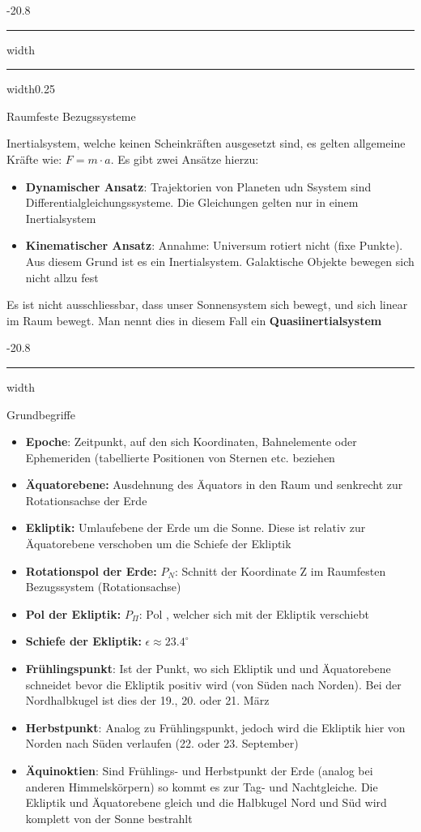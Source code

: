 \documentclass[9pt, landscape, fleqn]{scrartcl}
\makeatletter
\renewcommand{\subsection}{\@startsection{subsection}{1}{0mm}%
{-2\baselineskip}{0.8\baselineskip}%
{\hrule depth 0.2pt width\columnwidth\hrule depth0.75pt
width0.25\columnwidth\vspace*{1.2em}\large\bfseries\rmfamily}}
\renewcommand{\subsubsection}{\@startsection{subsubsection}{1}{0mm}%
{-2\baselineskip}{0.8\baselineskip}%
{\hrule depth 0.2pt width\columnwidth\vspace*{1.2em}\normalsize\bfseries\rmfamily}}
\makeatother
\begin{document}
\begin{multicols*}{3}
\subsection{Raumfeste Bezugssysteme}

Inertialsystem, welche keinen Scheinkräften ausgesetzt sind, es gelten allgemeine Kräfte wie: $F = m\cdot a$. Es gibt zwei Ansätze hierzu:

\begin{itemize}
    \item \textbf{Dynamischer Ansatz}: Trajektorien von Planeten udn Ssystem sind Differentialgleichungssysteme. Die Gleichungen gelten nur in einem Inertialsystem
    \item \textbf{Kinematischer Ansatz}: Annahme: Universum rotiert nicht (fixe Punkte). Aus diesem Grund ist es ein Inertialsystem. Galaktische Objekte bewegen sich nicht allzu fest
\end{itemize}

Es ist nicht ausschliessbar, dass unser Sonnensystem sich bewegt, und sich linear im Raum bewegt. Man nennt dies in diesem Fall ein \textbf{Quasiinertialsystem}

\subsubsection{Grundbegriffe}
\begin{itemize}
    \item \textbf{Epoche}: Zeitpunkt, auf den sich Koordinaten, Bahnelemente oder Ephemeriden (tabellierte Positionen von Sternen etc. beziehen
    \item \textbf{Äquatorebene:} Ausdehnung des Äquators in den Raum und senkrecht zur Rotationsachse der Erde
    \item \textbf{Ekliptik:} Umlaufebene der Erde um die Sonne. Diese ist relativ zur Äquatorebene verschoben um die Schiefe der Ekliptik
    \item \textbf{Rotationspol der Erde:} $P_N$: Schnitt der Koordinate Z im Raumfesten Bezugssystem (Rotationsachse)
    \item \textbf{Pol der Ekliptik:} $P_\Pi$: Pol , welcher sich mit der Ekliptik verschiebt
    \item \textbf{Schiefe der Ekliptik:} $\epsilon \approx 23.4^{\circ}$
    \item \textbf{Frühlingspunkt}: Ist der Punkt, wo sich Ekliptik und und Äquatorebene schneidet bevor die Ekliptik positiv wird (von Süden nach Norden). Bei der Nordhalbkugel ist dies der 19., 20. oder 21. März
    \item \textbf{Herbstpunkt}: Analog zu Frühlingspunkt, jedoch wird die Ekliptik hier von Norden nach Süden verlaufen (22. oder 23. September)
    \item \textbf{Äquinoktien}: Sind Frühlings- und Herbstpunkt der Erde (analog bei anderen Himmelskörpern) so kommt es zur Tag- und Nachtgleiche. Die Ekliptik und Äquatorebene gleich und die Halbkugel Nord und Süd wird komplett von der Sonne bestrahlt
\end{itemize}


\end{multicols*}
\end{document}
